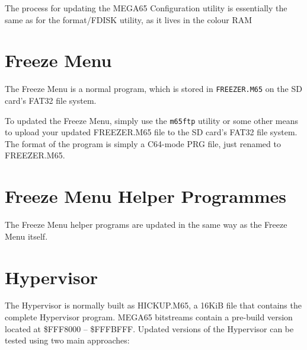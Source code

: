 The process for updating the MEGA65 Configuration utility is essentially the same as for the format/FDISK utility, as it lives in the colour RAM

\section{Freeze Menu}

The Freeze Menu is a normal program, which is stored in {\tt FREEZER.M65} on the SD card's FAT32 file system.

To updated the Freeze Menu, simply use the {\tt m65ftp} utility or some other means to upload your updated FREEZER.M65 file to the SD card's FAT32 file system.  The format of the program is simply a C64-mode PRG file, just renamed to FREEZER.M65.

\section{Freeze Menu Helper Programmes}

The Freeze Menu helper programs are updated in the same way as the Freeze Menu itself.

\section{Hypervisor}

The Hypervisor is normally built as HICKUP.M65, a 16KiB file that contains the complete Hypervisor program.  MEGA65 bitstreams contain a pre-build version located at \$FFF8000 -- \$FFFBFFF.  Updated versions of the Hypervisor can be tested using two main approaches:

